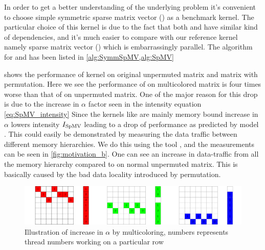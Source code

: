  In order to get a better understanding of the underlying problem it's convenient to choose simple symmetric sparse matrix vector (\SymmSpmv) as a benchmark kernel. The particular choice of this kernel is due to the fact that both \KACZ and \SymmSpmv have similar kind of dependencies, and it's much easier to compare with our reference kernel namely sparse matrix vector (\SpMV) which is embarrassingly parallel. The algorithm for \SymmSpmv  and \SpMV has been listed in \cref{alg:SymmSpMV,alg:SpMV}
 
 
  
  shows the performance of \SpMV kernel on original unpermuted matrix and matrix with \MC permutation. Here we see the performance of \SpMV on multicolored matrix is  four times  worse than that of  \SpMV on unpermuted matrix. One of the major reason for this drop is due to the increase in $\alpha$ factor seen in the intensity equation \cref{eq:SpMV_intensity}  Since the kernels like \SpMV  are mainly memory bound increase in $\alpha$ lowers intensity $I_\mathrm{SpMV}$ leading to a drop of performance as predicted by \roofline model \cite{Williams_roofline}. This could easily be demonstrated by measuring the data traffic between different memory hierarchies.  We do this using the \LIKWID tool \cite{LIKWID}, and the measurements can be seen in \cref{fig:motivation_b}. One can see an increase in data-traffic from all the memory hierarchy compared to \SpMV on normal unpermuted matrix. This is basically caused by the bad data locality introduced by \MCfull permutation.
 
  \begin{figure}[htbp]
  	\centering
  	\includegraphics[scale=0.45]{pics/mc_alpha_problem/mc_alpha}
  	\caption{Illustration of increase in $\alpha$ by multicoloring, numbers represents thread numbers working on a particular row}
  	\label{fig:mc_alpha}
  \end{figure}
  
